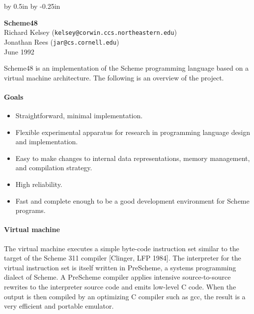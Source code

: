 
\pagestyle{empty}
\setlength{\textheight}{9in}
\setlength{\footheight}{0.0in}
\setlength{\topmargin}{0in}


\advance\textwidth by 0.5in
\advance\oddsidemargin by -0.25in




\vspace*{-0.3in}

\begin{center}
{\large\bf Scheme48} \\
\vspace{1ex}
Richard Kelsey ({\tt kelsey@corwin.ccs.northeastern.edu}) \\
Jonathan Rees ({\tt jar@cs.cornell.edu}) \\
June 1992
\end{center}

\vspace{1ex}

Scheme48 is an implementation of the Scheme programming language based
on a virtual machine architecture.  The following is an overview of
the project.

\paragraph{Goals}

\begin{itemize}
\setlength{\itemsep}{0pt}
\item Straightforward, minimal implementation.
\item Flexible experimental apparatus for research in programming
      language design and implementation.
\item Easy to make changes to internal data representations, memory
      management, and compilation strategy.
\item High reliability.
\item Fast and complete enough to be a good
      development environment for Scheme programs.
\end{itemize}


\paragraph{Virtual machine}

The virtual machine executes a simple byte-code instruction set
similar to the target of the Scheme 311 compiler [Clinger, LFP 1984].
The interpreter for the virtual instruction set is itself written in
PreScheme, a systems programming dialect of Scheme.  A PreScheme
compiler applies intensive source-to-source rewrites to the
interpreter source code and emits low-level C code.  When the output
is then compiled by an optimizing C compiler such as gcc, the result
is a very efficient and portable emulator.

